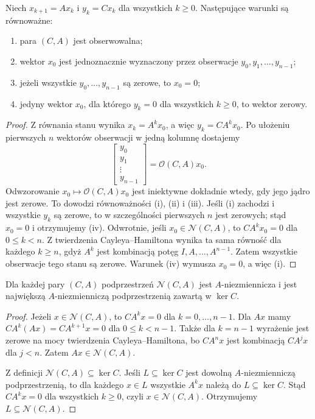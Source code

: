 \begin{twierdzenie}
\label{thm:lin25-observability}
Niech \(x_{k+1}=Ax_k\)
i \(y_k=Cx_k\)
dla wszystkich \(k\ge0\).
Następujące warunki
są równoważne:
\begin{enumerate}[label=\textup{(\roman*)}]
 \item para \((C,A)\) jest obserwowalna;
 \item wektor \(x_0\)
 jest jednoznacznie wyznaczony
 przez obserwacje
 \(y_0,y_1,\ldots,y_{n-1}\);
 \item jeżeli wszystkie
 \(y_0,\ldots,y_{n-1}\)
 są zerowe, to \(x_0=0\);
 \item jedyny wektor \(x_0\),
 dla którego \(y_k=0\)
 dla wszystkich \(k\ge0\),
 to wektor zerowy.
\end{enumerate}
\end{twierdzenie}
\begin{proof}
Z równania stanu wynika
\(x_k=A^kx_0\),
a więc
\(y_k=CA^kx_0\).
Po ułożeniu pierwszych \(n\)
wektorów obserwacji
w jedną kolumnę dostajemy
\[
 \begin{bmatrix}
 y_0\\y_1\\\vdots\\y_{n-1}
 \end{bmatrix}
 =\mathcal O(C,A)x_0.
\]
Odwzorowanie
\(x_0\mapsto\mathcal O(C,A)x_0\)
jest iniektywne dokładnie wtedy,
gdy jego jądro jest zerowe.
To dowodzi równoważności
(i), (ii) i (iii).
Jeśli (i) zachodzi
i wszystkie \(y_k\) są zerowe,
to w szczególności
pierwszych \(n\) jest zerowych;
stąd \(x_0=0\) i otrzymujemy (iv).
Odwrotnie, jeśli
\(x_0\in\mathcal N(C,A)\),
to \(CA^kx_0=0\)
dla \(0\le k<n\).
Z twierdzenia Cayleya--Hamiltona
wynika ta sama równość
dla każdego \(k\ge n\),
gdyż \(A^k\) jest kombinacją
potęg \(I,A,\ldots,A^{n-1}\).
Zatem wszystkie obserwacje
tego stanu są zerowe.
Warunek (iv) wymusza
\(x_0=0\), a więc (i).
\end{proof}

\begin{lemat}
\label{lem:lin25-unobservable-invariant}
Dla każdej pary \((C,A)\)
podprzestrzeń \(\mathcal N(C,A)\)
jest \(A\)-niezmiennicza
i jest największą
\(A\)-niezmienniczą podprzestrzenią
zawartą w \(\ker C\).
\end{lemat}
\begin{proof}
Jeżeli \(x\in\mathcal N(C,A)\),
to \(CA^kx=0\)
dla \(k=0,\ldots,n-1\).
Dla \(Ax\)
mamy \(CA^k(Ax)=CA^{k+1}x=0\)
dla \(0\le k<n-1\).
Także dla \(k=n-1\)
wyrażenie jest zerowe
na mocy twierdzenia
Cayleya--Hamiltona,
bo \(CA^nx\) jest kombinacją
\(CA^jx\) dla \(j<n\).
Zatem \(Ax\in\mathcal N(C,A)\).

Z definicji
\(\mathcal N(C,A)\subseteq\ker C\).
Jeśli \(L\subseteq\ker C\)
jest dowolną \(A\)-niezmienniczą
podprzestrzenią,
to dla każdego \(x\in L\)
wszystkie \(A^kx\)
należą do \(L\subseteq\ker C\).
Stąd \(CA^kx=0\)
dla wszystkich \(k\ge0\),
czyli \(x\in\mathcal N(C,A)\).
Otrzymujemy \(L\subseteq\mathcal N(C,A)\).
\end{proof}

